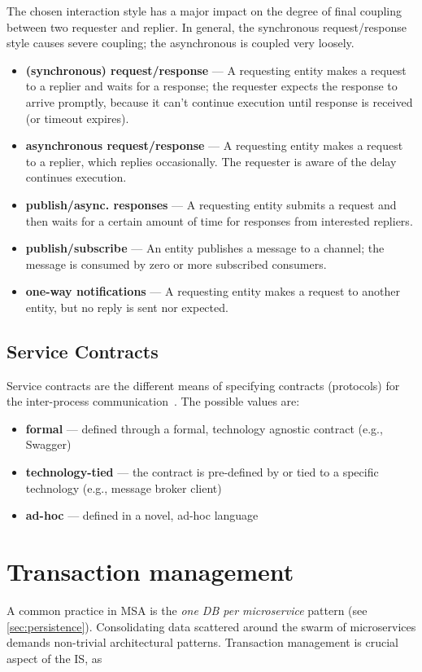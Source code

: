 \documentclass[thesis=M,english,hidelinks]{FITthesis}[2012/10/20]
\begin{document}
The chosen interaction style has a major impact on the degree of final coupling between two requester and replier. In general, the synchronous request/response style causes severe coupling; the asynchronous is coupled very loosely.
\begin{itemize}
    \item \textbf{(synchronous) request/response} --- A requesting entity makes a request to a replier and waits for a response; the requester expects the response to arrive promptly, because it can't continue execution until response is received (or timeout expires).
    \item \textbf{asynchronous request/response} --- A requesting entity makes a request to a replier, which replies occasionally. The requester is aware of the delay continues execution.
    \item \textbf{publish/async. responses} --- A requesting entity submits a request and then waits for a certain amount of time for responses from interested repliers.
    \item \textbf{publish/subscribe} --- An entity publishes a message to a channel; the message is consumed by zero or more subscribed consumers.
    \item \textbf{one-way notifications} --- A requesting entity makes a request to another entity, but no reply is sent nor expected.
\end{itemize}

\subsection{Service Contracts}
Service contracts are the different means of specifying contracts (protocols) for the inter-process communication~\cite{ms-today-tomorrow}. The possible values are:

\begin{itemize}
    \item \textbf{formal} --- defined through a formal, technology agnostic contract (e.g., Swagger)
    \item \textbf{technology-tied} --- the contract is pre-defined by or tied to a specific technology (e.g., message broker client)
    \item \textbf{ad-hoc} --- defined in a novel, ad-hoc language
\end{itemize}

% 
% 
\section{Transaction management}
\label{sec:transaction_management}
A common practice in \acrshort{MSA} is the \textit{one \acrshort{DB} per microservice} pattern (see \ref{sec:persistence}). Consolidating data scattered around the swarm of microservices demands non-trivial architectural patterns. Transaction management is crucial aspect of the \acrshort{IS}, as
\end{document}
